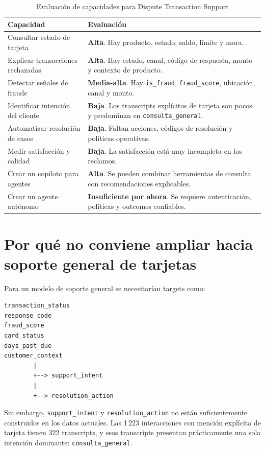 \documentclass[11pt,a4paper]{article}
\begin{document}
\begin{table}[ht]
\centering
\small
\caption{Evaluación de capacidades para Dispute Transaction Support}
\begin{tabularx}{\textwidth}{>{\raggedright\arraybackslash}p{} X}
\toprule
Capacidad & Evaluación \\
\midrule
Consultar estado de tarjeta & \textbf{Alta}. Hay producto, estado, saldo, límite y mora. \\
Explicar transacciones rechazadas & \textbf{Alta}. Hay estado, canal, código de respuesta, monto y contexto de producto. \\
Detectar señales de fraude & \textbf{Media-alta}. Hay \texttt{is\_fraud}, \texttt{fraud\_score}, ubicación, canal y monto. \\
Identificar intención del cliente & \textbf{Baja}. Los transcripts explícitos de tarjeta son pocos y predominan en \texttt{consulta\_general}. \\
Automatizar resolución de casos & \textbf{Baja}. Faltan acciones, códigos de resolución y políticas operativas. \\
Medir satisfacción y calidad & \textbf{Baja}. La satisfacción está muy incompleta en los reclamos. \\
Crear un copiloto para agentes & \textbf{Alta}. Se pueden combinar herramientas de consulta con recomendaciones explicables. \\
Crear un agente autónomo & \textbf{Insuficiente por ahora}. Se requiere autenticación, políticas y outcomes confiables. \\
\bottomrule
\end{tabularx}
\end{table}

\section{Por qué no conviene ampliar hacia soporte general de tarjetas}

Para un modelo de soporte general se necesitarían targets como:

\begin{lstlisting}
transaction_status
response_code
fraud_score
card_status
days_past_due
customer_context
        |
        +--> support_intent
        |
        +--> resolution_action
\end{lstlisting}

Sin embargo, \texttt{support\_intent} y \texttt{resolution\_action} no están suficientemente construidos en los datos actuales. Las 1\,223 interacciones con mención explícita de tarjeta tienen 322 transcripts, y esos transcripts presentan prácticamente una sola intención dominante: \texttt{consulta\_general}.
\end{document}
